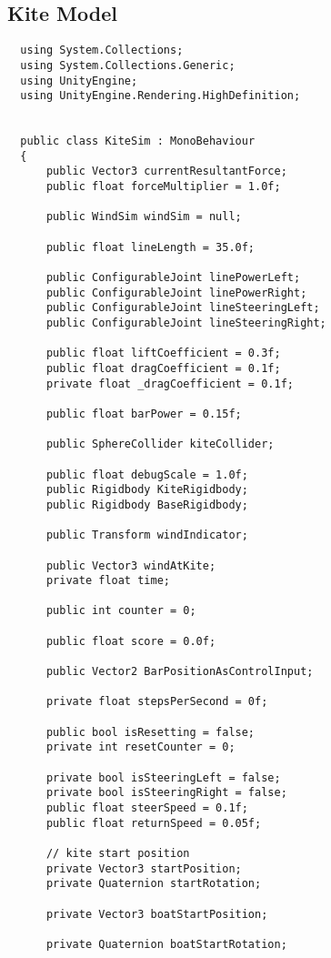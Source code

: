 \subsection{Kite Model}\label{sec:kite}
\begin{lstlisting}
  using System.Collections;
  using System.Collections.Generic;
  using UnityEngine;
  using UnityEngine.Rendering.HighDefinition;
  
  
  public class KiteSim : MonoBehaviour
  {
      public Vector3 currentResultantForce;
      public float forceMultiplier = 1.0f;
  
      public WindSim windSim = null;
  
      public float lineLength = 35.0f;
  
      public ConfigurableJoint linePowerLeft;
      public ConfigurableJoint linePowerRight;
      public ConfigurableJoint lineSteeringLeft;
      public ConfigurableJoint lineSteeringRight;
  
      public float liftCoefficient = 0.3f;
      public float dragCoefficient = 0.1f;
      private float _dragCoefficient = 0.1f;
  
      public float barPower = 0.15f;
  
      public SphereCollider kiteCollider;
  
      public float debugScale = 1.0f;
      public Rigidbody KiteRigidbody;
      public Rigidbody BaseRigidbody;
  
      public Transform windIndicator;
  
      public Vector3 windAtKite;
      private float time;
  
      public int counter = 0;
  
      public float score = 0.0f;
  
      public Vector2 BarPositionAsControlInput;
      
      private float stepsPerSecond = 0f;
  
      public bool isResetting = false;
      private int resetCounter = 0;
  
      private bool isSteeringLeft = false;
      private bool isSteeringRight = false;
      public float steerSpeed = 0.1f;
      public float returnSpeed = 0.05f;
  
      // kite start position
      private Vector3 startPosition;
      private Quaternion startRotation;
  
      private Vector3 boatStartPosition;
  
      private Quaternion boatStartRotation;
  

\end{lstlisting}
